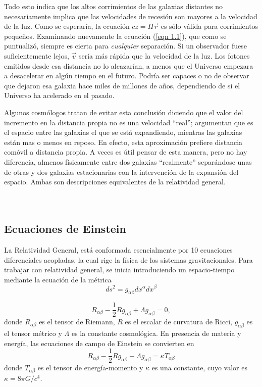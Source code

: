 \documentclass[a4paper,openright,12pt]{book}
\begin{document}
Todo esto indica que los altos corrimientos de las galaxias distantes no necesariamente implica que las velocidades de recesión son mayores a la velocidad de la luz. Como se esperaría, la ecuación $cz = H\vec{r}$ es sólo válida para corrimientos pequeños. Examinando nuevamente la ecuación (\ref{eqn 1.1}), que como se puntualizó, siempre es cierta para \textit{cualquier} separación. Si un observador fuese suficientemente lejos, $\vec{v}$ sería más rápida que la velocidad de la luz. Los fotones emitidos desde esa distancia no lo alcazarían, a menos que el Universo empezara a desacelerar en algún tiempo en el futuro. Podría ser capaces o no de observar que dejaron esa galaxia hace miles de millones de años, dependiendo de si el Universo ha acelerado en el pasado.

Algunos cosmólogos tratan de evitar esta conclusión diciendo que el valor del incremento en la distancia propia no es una velocidad ``real''; argumentan que es el espacio entre las galaxias el que se está expandiendo, mientras las galaxias están mas o menos en reposo. En efecto, esta aproximación prefiere distancia comóvil a distancia propia. A veces es útil pensar de esta manera, pero no hay diferencia, almenos físicamente entre dos galaxias ``realmente'' separándose unas de otras y dos galaxias estacionarias con la intervención de la expansión del espacio. Ambas son descripciones equivalentes de la relatividad general.\\\\\\


\subsection*{Ecuaciones de Einstein}

La Relatividad General, está conformada esencialmente por 10 ecuaciones diferenciales acopladas, la cual rige la física de los sistemas gravitacionales. Para trabajar con relatividad general, se inicia introduciendo un espacio-tiempo mediante la ecuación de la métrica
\begin{equation}
ds^{2}=g_{\alpha \beta}dx^{\alpha}dx^{\beta}\label{eqn 1.11}
\end{equation}

\begin{equation}
R_{\alpha \beta} - \frac{1}{2} R g_{\alpha \beta} + \Lambda g_{\alpha \beta} = 0,\label{eqn 1.12}
\end{equation}
donde $R_{\alpha \beta}$ es el tensor de Riemann, $R$ es el escalar de curvatura de Ricci, $g_{\alpha \beta}$ es el tensor métrico y $\Lambda$ es la constante cosmológica. En presencia de materia y energía, las ecuaciones de campo de Einstein se convierten en \cite{1.4}
\begin{equation}
R_{\alpha \beta} - \frac{1}{2} R g_{\alpha \beta} + \Lambda g_{\alpha \beta} = \kappa T_{\alpha \beta}\label{eqn 1.13}
\end{equation}
donde $T_{\alpha \beta}$ es el tensor de energía-momento y $\kappa$ es una constante, cuyo valor es $\kappa = 8 \pi G / c^{4}$.
\end{document}
